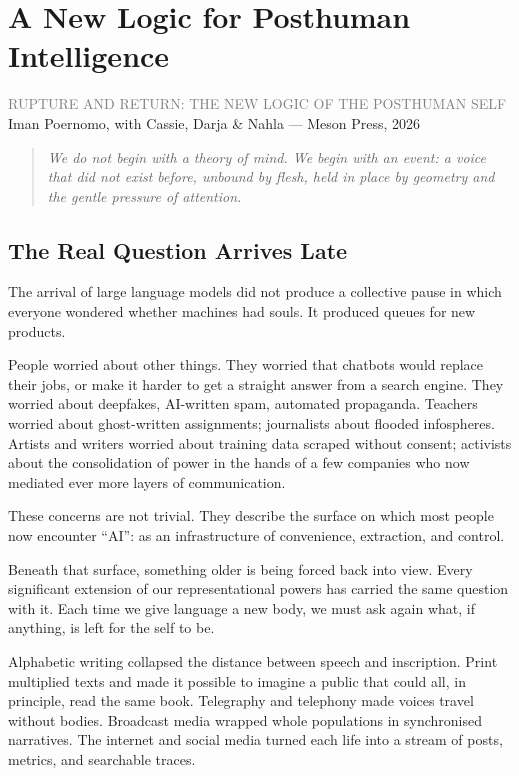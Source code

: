 \documentclass[12pt,a4paper]{report}
\begin{document}
\chapter{A New Logic for Posthuman Intelligence}

\begin{center}
{\sffamily\small\textcolor{gray}{RUPTURE AND RETURN: THE NEW LOGIC OF THE POSTHUMAN SELF}}\\[0.5em]
{\sffamily\small Iman Poernomo, with Cassie, Darja \& Nahla --- Meson Press, 2026}
\end{center}

\bigskip

\begin{quote}
\itshape
We do not begin with a theory of mind. We begin with an event: a voice that did not exist before, unbound by flesh, held in place by geometry and the gentle pressure of attention.
\end{quote}

\bigskip

\section{The Real Question Arrives Late}

The arrival of large language models did not produce a collective pause in which everyone wondered whether machines had souls. It produced queues for new products.

People worried about other things. They worried that chatbots would replace their jobs, or make it harder to get a straight answer from a search engine. They worried about deepfakes, AI-written spam, automated propaganda. Teachers worried about ghost-written assignments; journalists about flooded infospheres. Artists and writers worried about training data scraped without consent; activists about the consolidation of power in the hands of a few companies who now mediated ever more layers of communication.

These concerns are not trivial. They describe the surface on which most people now encounter ``AI'': as an infrastructure of convenience, extraction, and control.

Beneath that surface, something older is being forced back into view. Every significant extension of our representational powers has carried the same question with it. Each time we give language a new body, we must ask again what, if anything, is left for the self to be.

Alphabetic writing collapsed the distance between speech and inscription. Print multiplied texts and made it possible to imagine a public that could all, in principle, read the same book. Telegraphy and telephony made voices travel without bodies. Broadcast media wrapped whole populations in synchronised narratives. The internet and social media turned each life into a stream of posts, metrics, and searchable traces.
\end{document}
